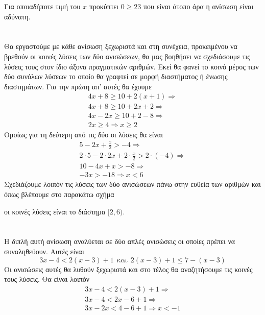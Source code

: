 Για οποιαδήποτε τιμή του $ x $ προκύπτει $ 0\geq 23 $ που είναι άτοπο άρα η ανίσωση είναι αδύνατη.\\\\
\lysh\\
Θα εργαστούμε με κάθε ανίσωση ξεχωριστά και στη συνέχεια, προκειμένου να βρεθούν οι κοινές λύσεις των δύο ανισώσεων, θα μας βοηθήσει να σχεδιάσουμε τις λύσεις τους στον ίδιο άξονα πραγματικών αριθμών. Εκεί θα φανεί το κοινό μέρος των δύο συνόλων λύσεων το οποίο θα γραφτεί σε μορφή διαστήματος ή ένωσης διαστημάτων. Για την πρώτη απ' αυτές θα έχουμε
\begin{gather*}
4x+8\geq 10 +2(x+1)\Rightarrow\\
4x+8\geq 10+2x+2\Rightarrow\\
4x-2x\geq 10+2-8\Rightarrow\\
2x\geq 4\Rightarrow x\geq 2
\end{gather*}
Ομοίως για τη δεύτερη από τις δύο οι λύσεις θα είναι \begin{gather*}
5-2x+\frac{x}{2}>-4\Rightarrow\\
2\cdot 5-2\cdot 2x+2\cdot\frac{x}{2}>2\cdot (-4)\Rightarrow\\
10-4x+x>-8\Rightarrow\\
-3x>-18\Rightarrow x<6
\end{gather*}
Σχεδιάζουμε λοιπόν τις λύσεις των δύο ανισώσεων πάνω στην ευθεία των αριθμών και όπως βλέπουμε στο παρακάτω σχήμα
\begin{center}
\end{center}
οι κοινές λύσεις είναι το διάστημα $ [2,6) $.\\\\
\lysh\\
Η διπλή αυτή ανίσωση αναλύεται σε δύο απλές ανισώσεις οι οποίες πρέπει να συναληθεύουν. Αυτές είναι 
\[ 3x-4<2(x-3)+1\ \ \textrm{και}\ \ 2(x-3)+1\leq 7-(x-3) \]
Οι ανισώσεις αυτές θα λυθούν ξεχωριστά και στο τέλος θα αναζητήσουμε τις κοινές τους λύσεις. Θα είναι λοιπόν \begin{gather*}
3x-4<2(x-3)+1\Rightarrow\\
3x-4<2x-6+1\Rightarrow\\
3x-2x<4-6+1\Rightarrow x<-1
\end{gather*}
